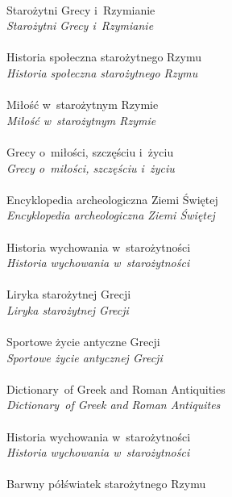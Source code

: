 \documentclass[a4paper,11pt]{article}
\numberwithin{equation}{section}
\begin{document}
 \\
\Jest Starożytni Grecy i~Rzymianie \\
\PowinnoByc \textit{Starożytni Grecy i~Rzymianie} \\
 \\
\Jest Historia społeczna starożytnego Rzymu \\
\PowinnoByc \textit{Historia społeczna starożytnego Rzymu} \\
 \\
\Jest Miłość w~starożytnym Rzymie \\
\PowinnoByc \textit{Miłość w~starożytnym Rzymie} \\
 \\
\Jest Grecy o~miłości, szczęściu i~życiu \\
\PowinnoByc \textit{Grecy o~miłości, szczęściu i~życiu} \\
 \\
\Jest Encyklopedia archeologiczna Ziemi Świętej \\
\PowinnoByc \textit{Encyklopedia archeologiczna Ziemi Świętej} \\
 \\
\Jest Historia wychowania w~starożytności \\
\PowinnoByc \textit{Historia wychowania w~starożytności} \\
 \\
\Jest Liryka starożytnej Grecji \\
\PowinnoByc \textit{Liryka starożytnej Grecji} \\
 \\
\Jest Sportowe życie antyczne Grecji \\
\PowinnoByc \textit{Sportowe życie antycznej Grecji} \\
 \\
\Jest Dictionary~of Greek and Roman Antiquities \\
\PowinnoByc \textit{Dictionary~of Greek and Roman Antiquites} \\
 \\
\Jest Historia wychowania w~starożytności \\
\PowinnoByc \textit{Historia wychowania w~starożytności} \\
 \\
\Jest Barwny półświatek starożytnego Rzymu \\
\end{document}
